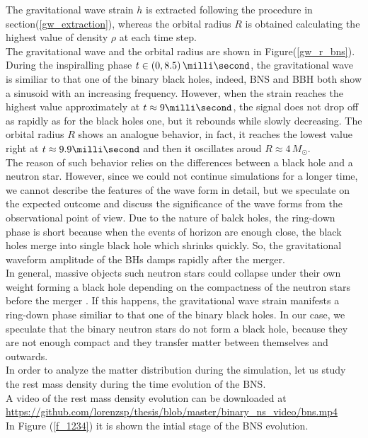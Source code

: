 The gravitational wave strain $h$ is extracted following the procedure in section(\ref{gw_extraction}), whereas the orbital radius $R$ is obtained calculating the highest value of density $\rho$ at each time step.\\
The gravitational wave and the orbital radius are shown in Figure(\ref{gw_r_bns}).
During the inspiralling phase $t \in (0, 8.5) \, \milli \second$, the gravitational wave is similiar to that one of the binary black holes, indeed, BNS and BBH both show a sinusoid with an increasing frequency.
However, when the strain reaches the highest value approximately at $t\approx 9 \milli \second$, the signal does not drop off as rapidly as for the black holes one, but it rebounds while slowly decreasing.
The orbital radius $R$ shows an analogue behavior, in fact, it reaches the lowest value right at $t \approx 9.9 \milli \second$ and then it oscillates aroud $R \approx 4 \, M _{\odot}$.\\
The reason of such behavior relies on the differences between a black hole and a neutron star.
However, since we could not continue simulations for a longer time, we cannot describe the features of the wave form in detail, but we speculate on the expected outcome and discuss the significance of the wave forms from the observational point of view.
Due to the nature of balck holes,  the ring-down phase is short because when the events of horizon are enough close, the black holes merge into single black hole which shrinks quickly.
So, the gravitational waveform amplitude of the BHs damps rapidly after the merger.\\
In general, massive objects such neutron stars could collapse under their own weight forming a black hole depending on the compactness of the neutron stars before the merger \cite{shibata_simulation_nodate,kiuchi_long-term_2009}.
If this happens, the gravitational wave strain manifests a ring-down phase similiar to that one of the binary black holes.
In our case, we speculate that the binary neutron stars do not form a black hole, because they are not enough compact and they transfer matter between themselves and outwards.\\
 In order to analyze the matter distribution during the simulation, let us study the rest mass density during the time evolution of the BNS.\\
A video of the rest mass density evolution can be downloaded at \url{https://github.com/lorenzsp/thesis/blob/master/binary_ns_video/bns.mp4}
 \\
In Figure (\ref{f_1234}) it is shown the intial stage of the BNS evolution.
